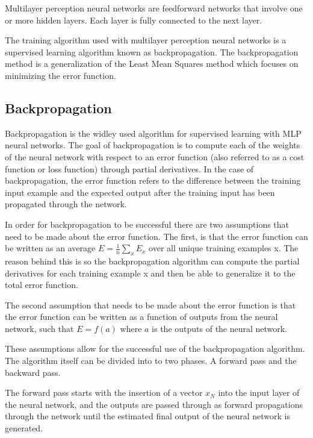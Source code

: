 Multilayer perception neural networks are feedforward networks that involve one or more hidden layers. Each layer is fully connected to the next layer.

The training algorithm used with multilayer perception neural networks is a supervised learning algorithm known as backpropagation. The backpropagation method is a generalization of the Least Mean Squares method which focuses on minimizing the error function. \cite{kar}


\subsection{Backpropagation}\label{sec:cap-num}
Backpropagation is the widley used algorithm for supervised learning with MLP neural networks. The goal of backpropagation is to compute each of the weights of the neural network with respect to an error function (also referred to as a cost function or loss function) through partial derivatives. In the case of backpropagation, the error function refers to the difference between the training input example and the expected output after the training input has been propagated through the network. \cite{nielsen_1970}

In order for backpropagation to be successful there are two assumptions that need to be made about the error function. The first, is that the error function can be written as an average $ E = \frac{1}{n}\sum_{x} E_x$ over all unique training examples x. The reason behind this is so the backpropagation algorithm can compute the partial derivatives for each training example x and then be able to generalize it to the total error function. \cite{nielsen_1970}

The second assumption that needs to be made about the error function is that the error function can be written as a function of outputs from the neural network, such that $E = f(a)$ where $a$ is the outputs of the neural network. \cite{nielsen_1970}

These assumptions allow for the successful use of the backpropagation algorithm. The algorithm itself can be divided into to two phases. A forward pass and the backward pass. 

The forward pass starts with the insertion of a vector $x_N$ into the input layer of the neural network, and the outputs are passed through as forward propagations through the network until the estimated final output of the neural network is generated. \cite{nielsen_1970}

